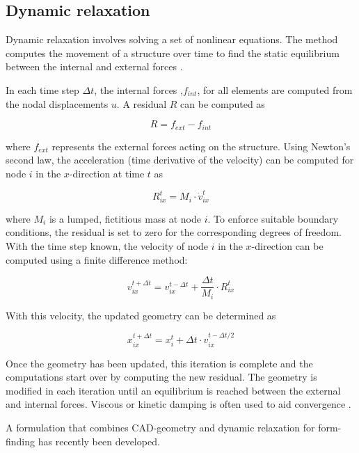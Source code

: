 \subsection{Dynamic relaxation}
\label{sec:dr}
Dynamic relaxation involves solving a set of nonlinear equations. The method computes the movement of a structure over time to find the static equilibrium between the internal and external forces \cite{Day1965, barnes1988form}. 

In each time step  $\Delta t$, the internal forces ,$f_{int}$, for all elements are computed from the nodal displacements $u$. A residual $R$ can be computed as

\begin{equation*}
  R = f_{ext} - f_{int} 
\end{equation*}

where $f_{ext}$ represents the external forces acting on the structure. Using Newton’s second law, the acceleration (time derivative of the velocity) can be computed for node $i$ in the $x$-direction at time $t$ as

\begin{equation*}
  R^t_{ix} = M_i  \cdot \dot{v}^t_{ix}
\end{equation*}

where $M_i$  is a lumped, fictitious mass at node $i$. To enforce suitable boundary conditions, the residual is set to zero for the corresponding degrees of freedom. With the time step known, the velocity of node $i$ in the $x$-direction can be computed using a finite difference method:

\begin{equation*}
  v^{t+\Delta t}_{ix} = v^{t-\Delta t}_{ix} + \frac{\Delta t}{M_i} \cdot R^t_{ix}
\end{equation*}

With this velocity, the updated geometry can be determined as

\begin{equation*}
  x^{t+\Delta t}_{ix} = x^t_i + \Delta t \cdot v_{ix}^{t-\Delta t / 2}
\end{equation*}

Once the geometry has been updated, this iteration is complete and the computations start over by computing the new residual. The geometry is modified in each iteration until an equilibrium is reached between the external and internal forces. Viscous or kinetic damping is often used to aid convergence \cite{barnes1988form}.

A formulation that combines CAD-geometry and dynamic relaxation \cite{Alic2015} for form-finding has recently been developed.

